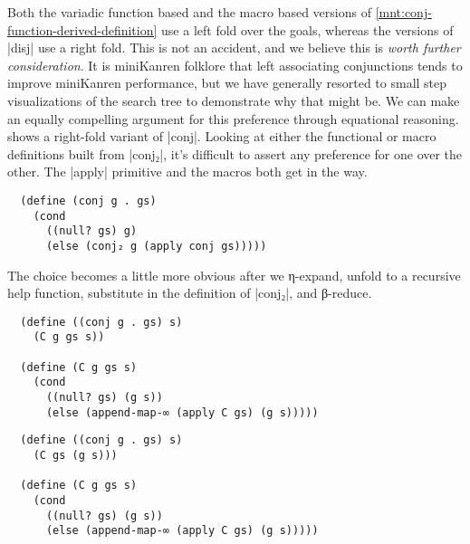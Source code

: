 \documentclass[sigplan,screen,draft,anonymous,review,natbib=false]{acmart}
\begin{document}
Both the variadic function based and the macro based versions of
\cref{mnt:conj-function-derived-definition} use a left fold over the
goals, whereas the versions of \rackinline|disj| use a right fold.
This is not an accident, and we believe this is \emph{worth further
  consideration}. It is miniKanren folklore that left associating
conjunctions tends to improve miniKanren performance, but we have
generally resorted to small step visualizations of the search tree to
demonstrate why that might be. We can make an equally compelling
argument for this preference through equational reasoning.
 shows a right-fold variant of
\rackinline|conj|. Looking at either the functional or macro
definitions built from \rackinline|conj₂|, it's difficult to assert
any preference for one over the other. The \rackinline|apply|
primitive and the macros both get in the way.



\begin{listing}
\begin{verbatim}
  (define (conj g . gs)
    (cond
      ((null? gs) g)
      (else (conj₂ g (apply conj gs)))))
\end{verbatim}
  \caption{A right-fold variant of \rackinline|conj|.}
  \label{mnt:conj-right-fold-definition}
\end{listing}

The choice becomes a little more obvious after we η-expand, unfold to
a recursive help function, substitute in the definition of
\rackinline|conj₂|, and β-reduce.

\begin{verbatim}
  (define ((conj g . gs) s)
    (C g gs s))

  (define (C g gs s)
    (cond
      ((null? gs) (g s))
      (else (append-map-∞ (apply C gs) (g s)))))
\end{verbatim}


\begin{verbatim}
  (define ((conj g . gs) s)
    (C gs (g s)))

  (define (C g gs s)
    (cond
      ((null? gs) (g s))
      (else (append-map-∞ (apply C gs) (g s)))))
\end{verbatim}
\end{document}
